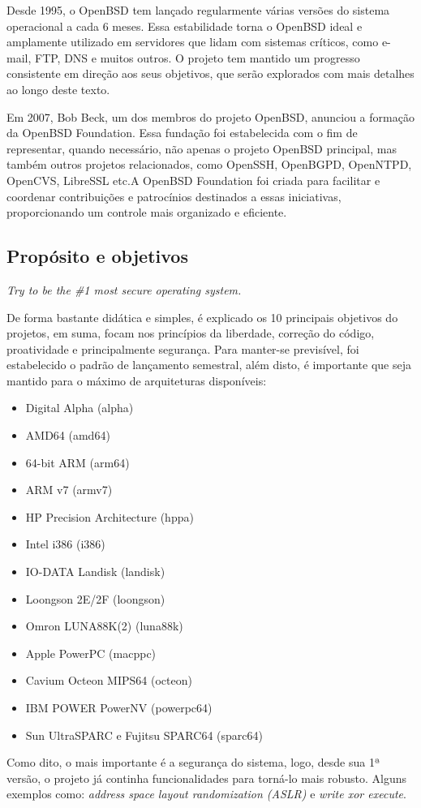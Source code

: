 \documentclass[a4paper,10pt]{article}
\begin{document}
Desde 1995, o OpenBSD tem lançado regularmente várias versões do sistema operacional a cada 6 meses. Essa estabilidade torna o OpenBSD ideal e amplamente utilizado em servidores que lidam com sistemas críticos, como e-mail, FTP, DNS e muitos outros. O projeto tem mantido um progresso consistente em direção aos seus objetivos, que serão explorados com mais detalhes ao longo deste texto.

Em 2007, Bob Beck, um dos membros do projeto OpenBSD, anunciou
a formação da OpenBSD Foundation. Essa fundação foi estabelecida com o fim de representar, quando necessário, não apenas o projeto OpenBSD principal, mas também outros projetos relacionados, como OpenSSH, OpenBGPD, OpenNTPD, OpenCVS, LibreSSL etc.A OpenBSD Foundation foi criada para facilitar e coordenar contribuições e patrocínios destinados a essas iniciativas, proporcionando um controle mais organizado e eficiente.

\subsection{Propósito e objetivos}
\begin{displayquote}
    \begin{center}
        \textit{Try to be the \#1 most secure operating system.}
    \end{center}
\end{displayquote}
De forma bastante didática e simples, é explicado os 10 principais objetivos do projetos, em suma, focam nos princípios da liberdade, correção do código, proatividade e principalmente segurança. Para manter-se previsível, foi estabelecido o padrão de lançamento semestral, além disto, é importante que seja mantido para o máximo de arquiteturas disponíveis:
\begin{itemize}
    \item Digital Alpha (alpha)
    \item AMD64 (amd64)
    \item 64-bit ARM (arm64)
    \item ARM v7 (armv7)
    \item HP Precision Architecture (hppa)
    \item Intel i386 (i386)
    \item IO-DATA Landisk (landisk)
    \item Loongson 2E/2F (loongson)
    \item Omron LUNA88K(2) (luna88k)
    \item Apple PowerPC (macppc)
    \item Cavium Octeon MIPS64 (octeon)
    \item IBM POWER PowerNV (powerpc64)
    \item Sun UltraSPARC e Fujitsu SPARC64 (sparc64)
\end{itemize}
Como dito, o mais importante é a segurança do sistema, logo, desde sua 1ª versão, o projeto já continha funcionalidades para torná-lo mais robusto. Alguns exemplos como: \textit{address space layout randomization (ASLR)} e \textit{write xor execute}.
\end{document}
